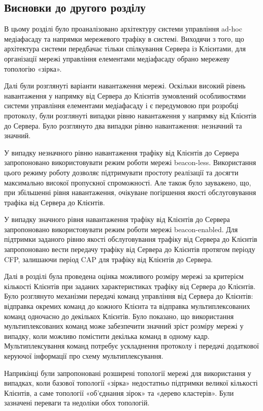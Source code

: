 \documentclass[a4paper,ukrainian,utf8,nocolumnsxix,floatsection,equationsection]{eskdtext}
\newcommand{\blm}[0]{beacon-less\xspace}
\newcommand{\bem}[0]{beacon-enabled\xspace}
\begin{document}
\subsection{Висновки до другого розділу}

В цьому розділі було проаналізовано архітектуру системи управління ad-hoc медіафасаду та напрямки мережевого трафіку в системі. Виходячи з того, що архітектура системи передбачає тільки спілкування Сервера із Клієнтами, для організації мережі управління елементами медіафасаду обрано мережеву топологію «зірка».

Далі були розглянуті варіанти навантаження мережі. Оскільки високий рівень навантаження у напрямку від Сервера до Клієнтів зумовлений особливостями системи управління елементами медіафасаду і є передумовою при розробці протоколу, були розглянуті випадки рівню навантаження у напрямку від Клієнтів до Сервера. Було розглянуто два випадки рівню навантаження: незначний та значний.

У випадку незначного рівню навантаження трафіку від Клієнтів до Сервера запропоновано використовувати режим роботи мережі \blm. Використання цього режиму роботу дозволяє підтримувати простоту реалізації та досягти максимально високої пропускної спроможності. Але також було зауважено, що, при збільшенні рівня навантаження, очікуване погіршення якості обслуговування трафіка від Сервера до Клієнтів. 

У випадку значного рівня навантаження трафіку від Клієнтів до Сервера запропоновано використовувати режим роботи мережі \bem. Для підтримки заданого рівню якості обслуговування трафіку від Сервера до Клієнтів запропоновано вести передачу трафіку від Сервера до Клієнтів протягом періоду CFP, залишаючи період CAP для трафіку від Клієнтів до Сервера.

Далі в розділі була проведена оцінка можливого розміру мережі за критерієм кількості Клієнтів при заданих характеристиках трафіку від Сервера до Клієнтів. Було розглянуто механізми передачі команд управління від Сервера до Клієнтів: відправка окремих команд до кожного Клієнта та відправка мультиплексованих команд одночасно до декількох Клієнтів. Було показано, що використання мультиплексованих команд може забезпечити значний зріст розміру мережі у випадку, коли можливо помістити декілька команд в одному кадр. Мультиплексування команд потребує ускладнення протоколу і передачі додаткової керуючої інформації про схему мультиплексування.

Наприкінці були запропоновані розширені топології мережі для використання у випадках, коли базової топології «зірка» недостатньо підтримки великої кількості Клієнтів, а саме топології «об'єднання зірок» та «дерево кластерів». Були зазначені переваги та недоліки обох топологій.
\end{document}

